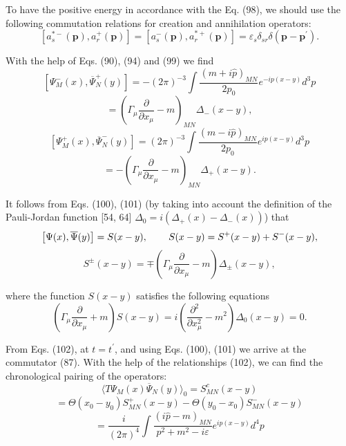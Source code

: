 \documentclass[a4paper,12pt]{article}
\begin{document}
To have the positive energy in accordance with the Eq. (98), we should use
the following commutation relations for creation and annihilation operators:
\begin{equation}
\left[ a_s^{*-}(\mathbf{p}),a_r^{+}(\mathbf{p})\right] =\left[
a_s^{-}( \mathbf{p}),a_r^{*+}(\mathbf{p})\right] =\varepsilon
_s\delta _{sr}\delta ( \mathbf{p}-\mathbf{p}^{\prime })
.\label{99}
\end{equation}

With the help of Eqs. (90), (94) and (99) we find
\[
\left[ \Psi _M^{-}(x),\overline{\Psi }_N^{+}(y)\right] =-(2\pi
)^{-3}\int \frac{\left( m+i\widehat{p}\right)
_{MN}}{2p_0}e^{-ip(x-y)}d^3p
\]
\vspace{-8mm}
\begin{equation}
\label{100}
\end{equation}
\vspace{-8mm}
\[
=\left( \Gamma _\mu \frac \partial {\partial x_\mu }-m\right)
_{MN}\Delta _{-}(x-y) ,
\]
\[
\left[ \Psi _M^{+}(x),\overline{\Psi }_N^{-}(y)\right] =(2\pi )^{-3}\int
\frac{\left( m-i\widehat{p}\right) _{MN}}{2p_0}e^{ip(x-y)}d^3p
\]
\vspace{-8mm}
\begin{equation}
\label{101}
\end{equation}
\vspace{-8mm}
\[
=-\left( \Gamma _\mu \frac \partial {\partial x_\mu }-m\right)
_{MN}\Delta _{+}(x-y) .
\]

It follows from Eqs. (100), (101) (by taking into account the definition of
the Pauli-Jordan function [54, 64] $\Delta _0=i\left( \Delta _{+}(x)-\Delta
_{-}(x)\right) $) that
\[
\left[ \Psi (x),\overline{\Psi }(y)\right] =S(x-y) ,\hspace{0.3in}
S(x-y)=S^{+}(x-y)+S^{-}(x-y) ,
\]
\vspace{-8mm}
\begin{equation}
\label{102}
\end{equation}
\vspace{-8mm}
\[
S^{\pm }(x-y)=\mp \left( \Gamma _\mu \frac \partial {\partial
x_\mu }-m\right) \Delta _{\pm }(x-y) ,
\]

where the function $S(x-y)$ satisfies the following equations
\begin{equation}
\left( \Gamma _\mu \frac \partial {\partial x_\mu }+m\right)
S(x-y)=i\left( \frac{\partial ^2}{\partial x_\mu ^2}-m^2\right)
\Delta _0(x-y)=0 .\label{103}
\end{equation}

From Eqs. (102), at $t=t^{\prime }$, and using Eqs. (100), (101) we arrive
at the commutator (87). With the help of the relationships (102), we can
find the chronological pairing of the operators:
\[
\langle T\Psi _M(x)\overline{\Psi }_N(y)\rangle _0=S_{MN}^c(x-y)
\]
\begin{equation}
=\Theta (x_0-y_0)S_{MN}^{+}(x-y)-\Theta (y_0-x_0)S_{MN}^{-}(x-y)  \label{104}
\end{equation}
\[
=\frac i{(2\pi )^4}\int \frac{\left( i\widehat{p}-m\right) _{MN}}{
p^2+m^2-i\varepsilon }e^{ip(x-y)}d^4p
\]
\end{document}

